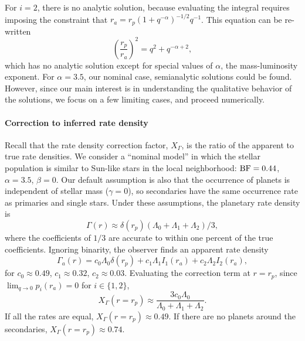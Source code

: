 For $i=2$, there is no analytic solution, because evaluating the integral 
requires imposing the constraint that $r_a  = r_p 
(1+q^{-\alpha})^{-1/2}q^{-1}$. This equation can be re-written
\begin{equation}
\left(\frac{r_p}{r_a}\right)^2 = q^2 + q^{-\alpha + 2},
\end{equation}
which has no analytic solution except for special values of $\alpha$, the 
mass-luminosity exponent.
For $\alpha=3.5$, our nominal case, semianalytic solutions could be found.
However, since our main interest is in understanding the qualitative behavior 
of the solutions, we focus on a few limiting cases, and proceed numerically.


\paragraph{Correction to inferred rate density}
Recall that the rate density correction factor, $X_\Gamma$, is the ratio of 
the apparent to true rate densities.
We consider a ``nominal model'' in which the stellar population is similar to 
Sun-like stars in the local neighborhood:
${\rm BF}=0.44$, $\alpha=3.5$, $\beta=0$.
Our default assumption is also that the occurrence of planets is independent 
of stellar mass ($\gamma=0$), so secondaries have the same occurrence rate as 
primaries and single stars.
Under these assumptions, the planetary rate density is
\begin{equation}
\Gamma(r) \approx \delta(r_p) \left( \Lambda_0 + \Lambda_1 + 
\Lambda_2 \right) / 3,
\label{eq:model2_Gamma_r}
\end{equation}
where the coefficients of $1/3$ are accurate to within one percent of the true 
coefficients.
Ignoring binarity, the observer finds an apparent rate density
\begin{equation}
\Gamma_a(r) = c_0 \Lambda_0 \delta(r_p)
             +c_1 \Lambda_1 I_1(r_a)
             +c_2 \Lambda_2 I_2(r_a),
\label{eq:model2_Gamma_a_r}
\end{equation}
for $c_0\approx 0.49$, $c_1\approx 0.32$, $c_2\approx 0.03$.
Evaluating the correction term at $r=r_p$, since $\lim_{q\rightarrow0} 
p_i(r_a)=0$ for $i\in\{1,2\}$,
\begin{equation}
X_\Gamma(r=r_p) \approx \frac{3c_0 \Lambda_0}{\Lambda_0+\Lambda_1+\Lambda_2}.
\end{equation}
If all the rates are equal, $X_\Gamma(r=r_p)\approx0.49$.
If there are no planets around the secondaries, $X_\Gamma(r=r_p)\approx0.74$.

